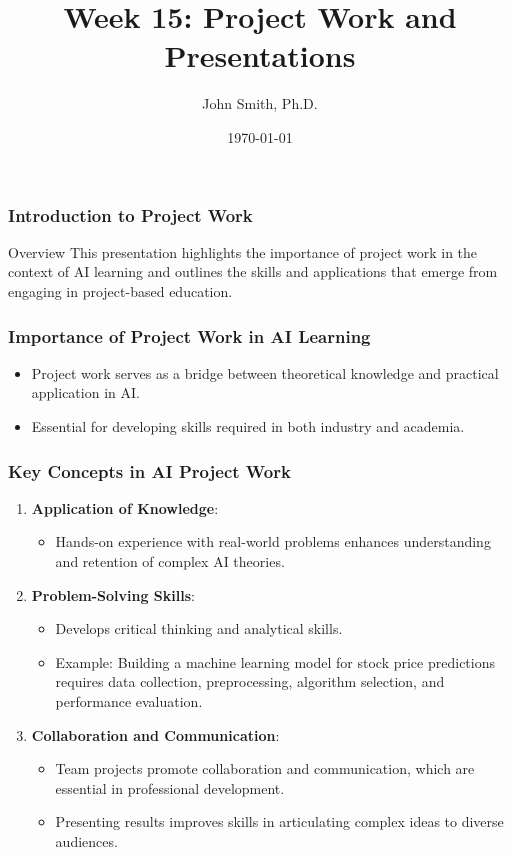 \documentclass[aspectratio=169]{beamer}
\title[Week 15: Project Work and Presentations]{Week 15: Project Work and Presentations}
\author[J. Smith]{John Smith, Ph.D.}
\institute[University Name]{
  Department of Computer Science\\
  University Name\\
  \vspace{0.3cm}
  Email: email@university.edu\\
  Website: www.university.edu
}
\date{\today}
\begin{document}
\frame{\titlepage}

\begin{frame}[fragile]
    \frametitle{Introduction to Project Work}
    \begin{block}{Overview}
        This presentation highlights the importance of project work in the context of AI learning and outlines the skills and applications that emerge from engaging in project-based education.
    \end{block}
\end{frame}

\begin{frame}[fragile]
    \frametitle{Importance of Project Work in AI Learning}
    \begin{itemize}
        \item Project work serves as a bridge between theoretical knowledge and practical application in AI.
        \item Essential for developing skills required in both industry and academia.
    \end{itemize}
\end{frame}

\begin{frame}[fragile]
    \frametitle{Key Concepts in AI Project Work}
    \begin{enumerate}
        \item \textbf{Application of Knowledge}:
            \begin{itemize}
                \item Hands-on experience with real-world problems enhances understanding and retention of complex AI theories.
            \end{itemize}
        
        \item \textbf{Problem-Solving Skills}:
            \begin{itemize}
                \item Develops critical thinking and analytical skills.
                \item Example: Building a machine learning model for stock price predictions requires data collection, preprocessing, algorithm selection, and performance evaluation.
            \end{itemize}
        
        \item \textbf{Collaboration and Communication}:
            \begin{itemize}
                \item Team projects promote collaboration and communication, which are essential in professional development.
                \item Presenting results improves skills in articulating complex ideas to diverse audiences.
            \end{itemize}
    \end{enumerate}
\end{frame}
\end{document}
